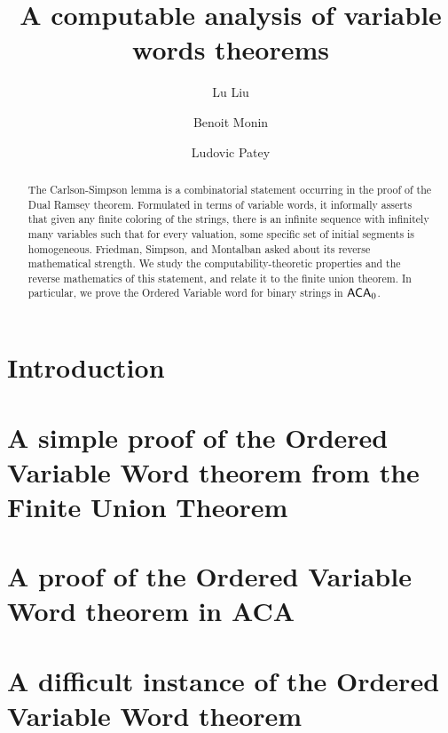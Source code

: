 \documentclass[options]{amsart}
\title{A computable analysis of variable words theorems}
\author{Lu Liu}
\author{Benoit Monin}
\author{Ludovic Patey}
\theoremstyle{definition}
\theoremstyle{remark}
\numberwithin{equation}{section}
\theoremstyle{noparens}
\begin{document}
\begin{abstract}
The Carlson-Simpson lemma is a combinatorial statement occurring in the proof of the Dual Ramsey theorem. Formulated in terms of variable words, it informally asserts that given any finite coloring of the strings, there is an infinite sequence with infinitely many variables such that for every valuation, some specific set of initial segments is homogeneous. Friedman, Simpson, and Montalban asked about its reverse mathematical strength. We study the computability-theoretic properties and the reverse mathematics of this statement, and relate it to the finite union theorem. In particular, we prove the Ordered Variable word for binary strings in $\operatorname{\sf{ACA}}_0$. 
\end{abstract}

\maketitle



\section{Introduction}


\section{A simple proof of the Ordered Variable Word theorem from the Finite Union Theorem}\label{sect:ht-ovw}



\section{A proof of the Ordered Variable Word theorem in ACA}\label{sect:ovw-aca}



\section{A difficult instance of the Ordered Variable Word theorem}\label{sect:ovw-lower-bounds}


%




\appendix

%
\end{document}
